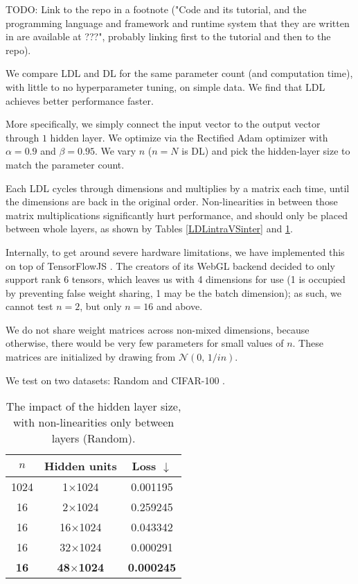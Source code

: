 \documentclass{article}
\begin{document}
    TODO: Link to the repo in a footnote ("Code and its tutorial, and the programming language and framework and runtime system that they are written in are available at ???", probably linking first to the tutorial and then to the repo).

We compare LDL and DL for the same parameter count (and computation time), with little to no hyperparameter tuning, on simple data. We find that LDL achieves better performance faster.

More specifically, we simply connect the input vector to the output vector through $1$ hidden layer. We optimize via the Rectified Adam optimizer \cite{liu2019radam} with $\alpha=0.9$ and $\beta=0.95$. We vary $n$ ($n=N$ is DL) and pick the hidden-layer size to match the parameter count.

Each LDL cycles through dimensions and multiplies by a matrix each time, until the dimensions are back in the original order. Non-linearities in between those matrix multiplications significantly hurt performance, and should only be placed between whole layers, as shown by Tables \ref{LDLintraVSinter} and \ref{LDLscaling}.

Internally, to get around severe hardware limitations, we have implemented this on top of TensorFlowJS \cite{tensorflow2015-whitepaper}. The creators of its WebGL backend decided to only support rank $6$ tensors, which leaves us with 4 dimensions for use (1 is occupied by preventing false weight sharing, 1 may be the batch dimension); as such, we cannot test $n=2$, but only $n=16$ and above.

We do not share weight matrices across non-mixed dimensions, because otherwise, there would be very few parameters for small values of $n$. These matrices are initialized by drawing from $\mathcal{N}(0,\,1/in)$.

We test on two datasets: Random and CIFAR-100 \cite{Krizhevsky09learningmultiple}.

\begin{table}
\begin{center}
\begin{tabular}{ccc}
\hline
$n$ & Hidden units & Loss $\downarrow$ \\
\hline
1024 & 1$\times$1024 & 0.001195 \\
\hline
16 & 2$\times$1024 & 0.259245 \\
16 & 16$\times$1024 & 0.043342 \\
16 & 32$\times$1024 & 0.000291 \\
\textbf{16} & \textbf{48$\times$1024} & \textbf{0.000245} \\
\hline
\end{tabular}
\end{center}
\caption{The impact of the hidden layer size, with non-linearities only between layers (Random).}
\label{LDLscaling}
\end{table}
\end{document}
